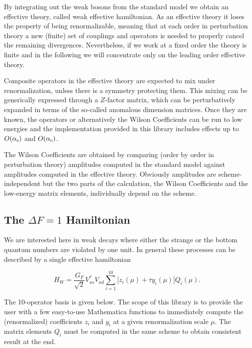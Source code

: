 
By integrating out the weak bosons from the standard model we obtain an 
effective theory, called weak effective hamiltonian. 
As an effective theory it loses the property of being renormalizable,
meaning that at each order in perturbation theory a new (finite) set of couplings and operators
is needed to properly cancel the remaining divergences. Nevertheless, if we work at a fixed 
order the theory is finite and in the following we will concentrate only 
on the leading order effective theory.

Composite operators in the effective theory are expected to mix under renormalization, unless
there is a symmetry protecting them. This mixing can be generically expressed through a 
$Z$-factor matrix, which can be perturbatively expanded in terms of the so-called 
anomalous dimension matrices. Once they are known, the operators or alternatively the Wilson Coefficients
can be run to low energies and the implementation provided in this library includes effects
up to $O(\alpha_{\rm s})$ and $O(\alpha_{\rm e})$.

The Wilson Coefficients are obtained by comparing 
(order by order in perturbation theory) amplitudes computed in the standard model
against amplitudes computed in the effective theory. Obviously amplitudes are scheme-independent
but the two parts of the calculation, the Wilson Coefficients and the low-energy matrix elements, 
individually depend on the scheme. 

\subsection{The $\Delta F=1$ Hamiltonian}

We are interested here in weak decays where either the strange or the bottom quantum numbers 
are violated by one unit. In general these processes can be described by a single effective
hamiltonian

\begin{equation}
H_W = \frac{G_F}{\sqrt{2}}V_{us}^*V_{ud}\sum_{i=1}^{10} \bigl[z_i(\mu) + \tau y_i(\mu)\bigr] Q_i(\mu).
\label{eq:H_W}
\end{equation}

The 10-operator basis is given below. The scope of this library is to provide the user
with a few easy-to-use Mathematica functions to immediately compute the (renormalized) 
coefficients $z_i$ and $y_i$ at a given renormalization scale $\mu$. The matrix elements 
$Q_i$ must be computed in the same scheme to obtain consistent result at the end.

